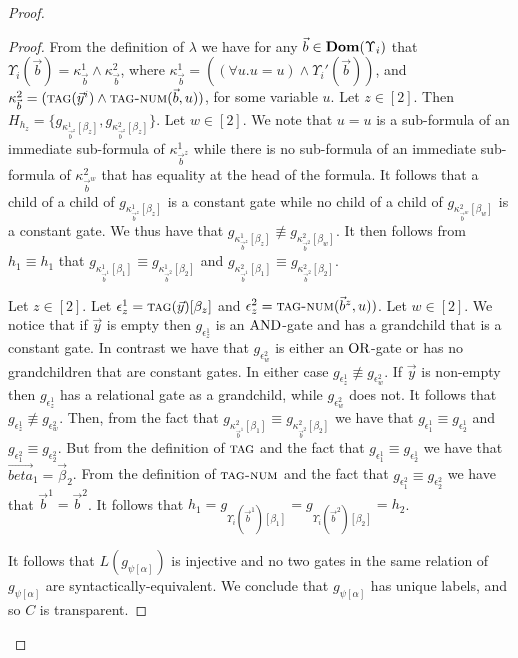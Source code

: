 \documentclass[../main/thesis.tex]{subfiles}
\begin{document}
\begin{proof}
\begin{proof}
  From the definition of $\lambda$ we have for any $\vec{b} \in
  \text{\textbf{Dom}}(\Upsilon_i)$ that $\Upsilon_i(\vec{b}) = \kappa^1_{ \vec{b}} \land
  \kappa^2_{\vec{b}}$, where $\kappa^1_{\vec{b}} = ((\forall u. u = u) \land
  \Upsilon_i'(\vec{b}))$, and $\kappa^2_{\vec{b}} = ({\normalfont\textsc{tag}}(\vec{y}^i) \land
  {\normalfont\textsc{tag-num}}(\vec{b}, u))$, for some variable $u$. Let $z \in [2]$. Then
  $H_{h_z} = \{g_{\kappa^1_{\vec{b}^z}[\beta_z]},
  g_{\kappa^2_{\vec{b}^z}[\beta_z]}\}$. Let $w \in [2]$. We note that $u = u$ is
  a sub-formula of an immediate sub-formula of $\kappa^1_{ \vec{b}^z}$ while
  there is no sub-formula of an immediate sub-formula of $\kappa^2_{ \vec{b}^w}$
  that has equality at the head of the formula. It follows that a child of a
  child of $g_{\kappa^1_{ \vec{b}^z}[\beta_z]}$ is a constant gate while no
  child of a child of $g_{\kappa^2_{ \vec{b}^w}[\beta_w]}$ is a constant gate.
  We thus have that $g_{\kappa^1_{ \vec{b}^z}[\beta_z]} \not\equiv g_{\kappa^2_{
      \vec{b}^2}[\beta_w]}$. It then follows from $h_1 \equiv h_1$ that
  $g_{\kappa^1_{ \vec{b}^1}[\beta_1]} \equiv g_{\kappa^1_{ \vec{b}^2}[\beta_2]}$
  and $g_{\kappa^2_{ \vec{b}^1} [\beta_1]} \equiv g_{\kappa^2_{ \vec{b}^2}
    [\beta_2]}$.

  Let $z \in [2]$. Let $\epsilon^1_z = {\normalfont\textsc{tag}}(\vec{y})[\beta_z]$ and
  $\epsilon^2_z = {\normalfont\textsc{tag-num}}(\vec{b}^z, u))$. Let $w \in [2]$. We notice that
  if $\vec{y}$ is empty then $g_{\epsilon^1_z}$ is an $\text{\upshape AND}$-gate and has a
  grandchild that is a constant gate. In contrast we have that
  $g_{\epsilon^2_w}$ is either an $\text{\upshape OR}$-gate or has no grandchildren that are
  constant gates. In either case $g_{\epsilon^1_z} \not\equiv g_{\epsilon^2_w}$.
  If $\vec{y}$ is non-empty then $g_{\epsilon^1_z}$ has a relational gate as a
  grandchild, while $g_{\epsilon^2_w}$ does not. It follows that
  $g_{\epsilon^1_z} \not\equiv g_{\epsilon^2_w}$. Then, from the fact that
  $g_{\kappa^2_{ \vec{b}^1} [\beta_1]} \equiv g_{\kappa^2_{ \vec{b}^2}
    [\beta_2]}$ we have that $g_{\epsilon^1_1} \equiv g_{\epsilon^1_2}$ and
  $g_{\epsilon^2_1} \equiv g_{\epsilon^2_2}$. But from the definition of
  ${\normalfont\textsc{tag}}$ and the fact that $g_{\epsilon^1_1} \equiv g_{\epsilon^1_2}$ we
  have that $\vec{beta}_1 = \vec{\beta}_2$. From the definition of
  ${\normalfont\textsc{tag-num}}$ and the fact that $g_{\epsilon^2_1} \equiv g_{\epsilon^2_2}$ we
  have that $\vec{b}^1 = \vec{b}^2$. It follows that $h_1 =
  g_{\Upsilon_i(\vec{b}^1)[\beta_1]} = g_{\Upsilon_i(\vec{b}^2)[\beta_2]} =
  h_2$.

  It follows that $L(g_{\psi[\alpha]})$ is injective and no two gates in the
  same relation of $g_{\psi[\alpha]}$ are syntactically-equivalent. We conclude
  that $g_{\psi[\alpha]}$ has unique labels, and so $C$ is transparent.
\end{proof}


\end{proof}
\end{document}
